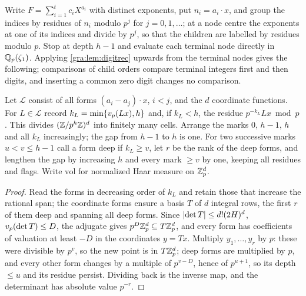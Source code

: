 Write $F=\sum_{i=1}^tc_iX^{a_i}$ with distinct exponents, put
$n_i=a_i\cdot x$, and group the indices by residues of $n_i$ modulo $p^j$
for $j=0,1,\dots$; at a node centre the exponents at one of its indices and
divide by $p^j$, so that the children are labelled by residues modulo $p$.
Stop at depth $h-1$ and evaluate each terminal node directly in
$\mathbb{Q}_p(\zeta_1)$. Applying \cref{gra:lem:digitrec} upwards from the terminal
nodes gives the following; comparisons of child orders compare terminal
integers first and then digits, and inserting a common zero digit changes
no comparison.


Let $\mathcal L$ consist of all forms $(a_i-a_j)\cdot x$, $i<j$, and the $d$
coordinate functions. For $L\in\mathcal L$ record $k_L=\min\{v_p(Lx),h\}$
and, if $k_L<h$, the residue $p^{-k_L}Lx\bmod p$. This divides
$(\mathbb{Z}/p^h\mathbb{Z})^d$ into finitely many cells. Arrange the marks $0$, $h-1$, $h$
and all $k_L$ increasingly; the gap from $h-1$ to $h$ is one. For two
successive marks $u<v\le h-1$ call a form deep if $k_L\ge v$, let $r$ be the
rank of the deep forms, and lengthen the gap by increasing $h$ and every
mark $\ge v$ by one, keeping all residues and flags. Write $\mathrm{vol}$
for normalized Haar measure on $\mathbb{Z}_p^d$.


\begin{proof}
Read the forms in decreasing order of $k_L$ and retain those that increase
the rational span; the coordinate forms ensure a basis $T$ of $d$ integral
rows, the first $r$ of them deep and spanning all deep forms. Since
$\lvert\det T\rvert\le d!(2H)^d$, $v_p(\det T)\le D$, the adjugate gives
$p^D\mathbb{Z}_p^d\subseteq T\mathbb{Z}_p^d$, and every form has coefficients of valuation at
least $-D$ in the coordinates $y=Tx$. Multiply $y_1,\dots,y_r$ by $p$: these
were divisible by $p^v$, so the new point is in $T\mathbb{Z}_p^d$; deep forms are
multiplied by $p$, and every other form changes by a multiple of
$p^{v-D}$, hence of $p^{u+1}$, so its depth $\le u$ and its residue
persist. Dividing back is the inverse map, and the determinant has absolute
value $p^{-r}$.
\end{proof}

